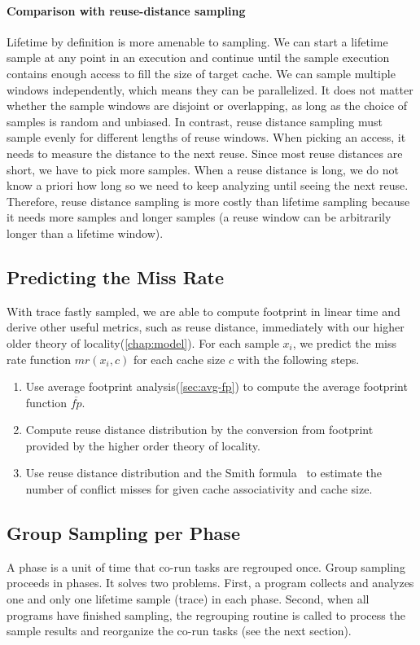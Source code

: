 \paragraph{Comparison with reuse-distance sampling}
Lifetime by definition is more amenable to sampling.  We can start a
lifetime sample at any point in an execution and continue until the
sample execution contains enough access to fill the size of target cache.
We can sample multiple windows independently, which means they can be
parallelized.  It does not matter whether the sample windows are
disjoint or overlapping, as long as the choice of samples is random
and unbiased.  In contrast, reuse distance sampling must sample evenly
for different lengths of reuse windows.  When picking an access, it
needs to measure the distance to the next reuse.  Since most reuse
distances are short, we have to pick more samples.  When a reuse
distance is long, we do not know a priori how long so we need to keep
analyzing until seeing the next reuse.  Therefore, reuse distance
sampling is more costly than lifetime sampling because it needs more
samples and longer samples (a reuse window can be arbitrarily longer
than a lifetime window). 


\subsection{Predicting the Miss Rate}
With trace fastly sampled, we are able to compute footprint in linear
time and derive other useful metrics, such as reuse distance,
immediately with our higher older theory of locality(\ref{chap:model}). 
For each sample $x_i$, we predict the miss rate function $mr(x_i, c)$
for each cache size $c$ with the following steps.

\begin{enumerate}
\item Use average footprint analysis(\ref{sec:avg-fp}) to compute
  the average footprint function $\overline{fp}$.  
\item Compute reuse distance distribution by the conversion from
  footprint provided by the higher order theory of locality.
\item Use reuse distance distribution and the Smith
  formula~\cite{Smith:ICSE76} to estimate the number of conflict
  misses for given cache associativity and cache size. 
\end{enumerate}

\subsection{Group Sampling per Phase}
A phase is a unit of time that co-run tasks are regrouped once.
Group sampling proceeds in phases.  It solves two problems.  First, a
program collects and analyzes one and only one lifetime sample (trace)
in each phase.  Second, when all programs have finished
sampling, the regrouping routine is called to
process the sample results and reorganize the co-run tasks (see the next
section).


